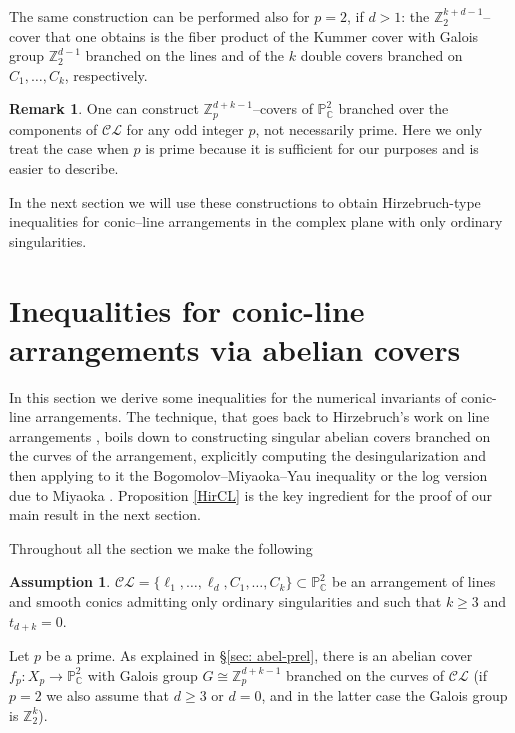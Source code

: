 \documentclass[12pt]{amsart}
\theoremstyle{plain}
\theoremstyle{definition}
\newtheorem{remark}[thm]{Remark}
\newtheorem{assumption}[thm]{Assumption}
\newcommand\pp[1]{\todo[color=cyan!50]{#1}} %
\renewcommand\ge{\geqslant}
\renewcommand\geq{\geqslant}
\newcommand\CL{\mathcal{CL}}
\newcommand\bZ{\mathbb Z}
\renewcommand\pp{\mathbb P}
\newcommand{\Z}{\mathbb Z}
\newcommand{\C}{\mathbb C}
\begin{document}
The same construction can be performed also for $p=2$, if $d>1$: the $\bZ_2^{k+d-1}$--cover that one obtains is the fiber product of the Kummer cover with Galois group $\bZ_2^{d-1}$ branched on the lines and of the $k$ double covers branched on $C_{1},\ldots ,C_{k}$, respectively.

\begin{remark}
One can construct $\Z_p^{d+k-1}$--covers of $\pp^2_{\C}$ branched over the components of $\CL$ for any odd integer $p$, not necessarily prime. Here we only treat the case when $p$ is prime because it is sufficient for our purposes and is easier to describe. 
\end{remark}
In the next section we will use these constructions to obtain  Hirzebruch-type inequalities for conic--line arrangements in the complex plane with only ordinary singularities.



\section{Inequalities for  conic-line arrangements via abelian covers}\label{sec: abcovers}

In this section we derive some inequalities for the numerical invariants of conic-line arrangements. The technique, that goes back to Hirzebruch's work on line arrangements \cite{Hirzebruch83}, boils down to constructing singular abelian covers branched on the curves of the arrangement, explicitly computing the desingularization and then applying  to it the Bogomolov--Miyaoka--Yau inequality or the log version due to Miyaoka  \cite{M84}.
Proposition \ref{HirCL} is the key ingredient for the proof of our main result in the next section.

Throughout all the section we make the following
\begin{assumption}
 $\mathcal{CL} = \{\ell_{1}, \ldots, \ell_{d}, C_{1}, \ldots, C_{k}\} \subset \mathbb{P}^{2}_{\mathbb{C}}$ be an arrangement of lines and smooth conics admitting only ordinary singularities and such that $k\geq 3$ and $t_{d+k}=0$. 
\end{assumption}

Let $p$ be a prime. As explained in \S \ref{sec: abel-prel}, there is an abelian cover $f_p \colon  X_p \rightarrow \mathbb{P}^{2}_{\mathbb{C}}$ with Galois group $G\cong \mathbb{Z}_p^{d+k-1}$ branched  on the curves of $\mathcal{CL}$ (if $p=2$ we also assume that $d\ge 3$ or $d=0$, and in the latter case the Galois group is $\Z_2^k$). 
\end{document}

